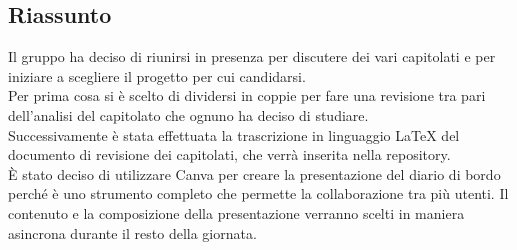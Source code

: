 \documentclass[10pt]{article}
\begin{document}
\subsection{Riassunto}
Il gruppo ha deciso di riunirsi in presenza per discutere dei vari capitolati e per iniziare a scegliere il progetto per cui candidarsi.\\
Per prima cosa si è scelto di dividersi in coppie per fare una revisione tra pari dell'analisi del capitolato che ognuno ha deciso di studiare.\\
Successivamente è stata effettuata la trascrizione in linguaggio LaTeX del documento di revisione dei capitolati, che verrà inserita nella repository.\\
È stato deciso di utilizzare Canva per creare la presentazione del diario di bordo perché è uno strumento completo che permette la collaborazione tra più utenti.
Il contenuto e la composizione della presentazione verranno scelti in maniera asincrona durante il resto della giornata. 
\end{document}
